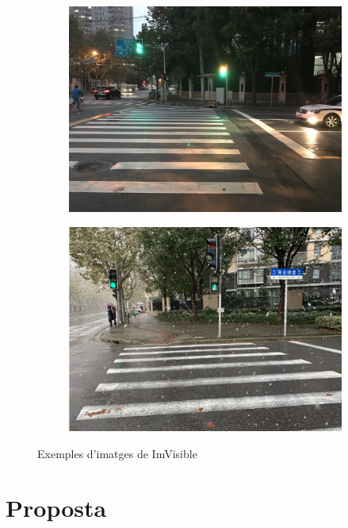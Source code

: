 \documentclass[10pt,a4paper,twocolumn,twoside]{article}
\begin{document}
\begin{figure}[!h]
	\centering
	\begin{subfigure}{0.4\columnwidth}
		\includegraphics[width=\linewidth]{figs/3}
	\end{subfigure}
	\quad
	\begin{subfigure}{0.4\columnwidth}
		\includegraphics[width=\linewidth]{figs/4}
	\end{subfigure}
	\caption{Exemples d'imatges de ImVisible}
\end{figure}

\section{Proposta}
\end{document}
